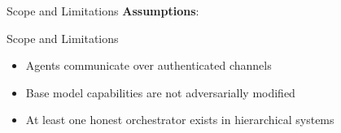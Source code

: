 \documentclass[
  ignorenonframetext,
]{beamer}
\begin{document}
\begin{frame}[allowframebreaks]{Scope and Limitations}
\textbf{Assumptions}:

\end{frame}

\begin{frame}[allowframebreaks]{Scope and Limitations}
\begin{itemize}
\item Agents communicate over authenticated channels
\item Base model capabilities are not adversarially modified
\item At least one honest orchestrator exists in hierarchical systems
\end{itemize}
\end{frame}
\end{document}
